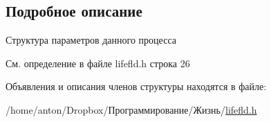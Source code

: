 \subsection{Подробное описание}
Структура параметров данного процесса 

См. определение в файле lifefld.\+h строка 26



Объявления и описания членов структуры находятся в файле\+:\begin{DoxyCompactItemize}
\item 
/home/anton/\+Dropbox/Программирование/Жизнь/\hyperlink{lifefld_8h}{lifefld.\+h}\end{DoxyCompactItemize}
